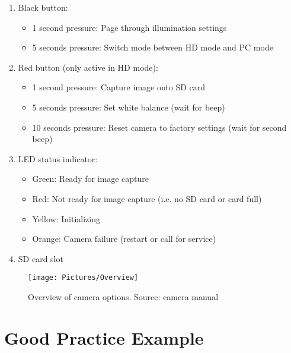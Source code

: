 \documentclass[12pt]{article}
\begin{document}
\begin{enumerate}
	\item Black button:
	\begin{itemize}
		\item 1 second pressure: Page through illumination settings
		\item 5 seconds pressure: Switch mode between HD mode and PC mode
	\end{itemize}

	\item Red button (only active in HD mode):
	\begin{itemize}
		\item 1 second pressure: Capture image onto SD card
		\item 5 seconds pressure: Set white balance (wait for beep)
		\item 10 seconds pressure: Reset camera to factory settings (wait for second beep)
	\end{itemize}

	\item LED status indicator:
	\begin{itemize}
		\item Green: Ready for image capture
		\item Red: Not ready for image capture (i.e. no SD card or card full)
		\item Yellow: Initializing
		\item Orange: Camera failure (restart or call for service) 
	\end{itemize}

	\item SD card slot
\end{enumerate}

\begin{figure}[h!]
	\centering
	\texttt{[image: Pictures/Overview]}
	\caption{Overview of camera options. Source: camera manual}
\end{figure}

\newpage
\section{Good Practice Example}


\end{document}
